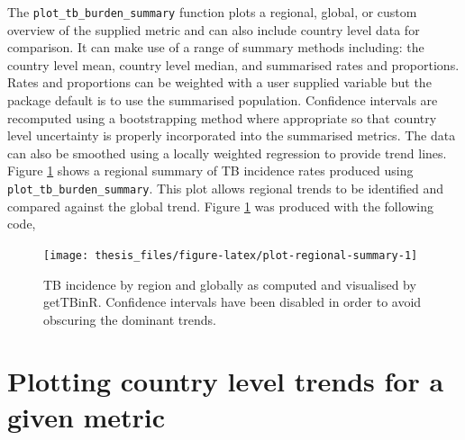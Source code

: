 \documentclass[11pt,twoside]{bristolthesis}
\begin{document}
  The \texttt{plot\_tb\_burden\_summary} function plots a regional, global, or custom overview of the supplied metric and can also include country level data for comparison. It can make use of a range of summary methods including: the country level mean, country level median, and summarised rates and proportions. Rates and proportions can be weighted with a user supplied variable but the package default is to use the summarised population. Confidence intervals are recomputed using a bootstrapping method where appropriate so that country level uncertainty is properly incorporated into the summarised metrics. The data can also be smoothed using a locally weighted regression to provide trend lines. Figure \ref{fig:plot-regional-summary} shows a regional summary of TB incidence rates produced using \texttt{plot\_tb\_burden\_summary}. This plot allows regional trends to be identified and compared against the global trend. Figure \ref{fig:plot-regional-summary} was produced with the following code,
  \begin{Shaded}
  \begin{Highlighting}[]
  \NormalTok{(} \NormalTok{, } \NormalTok{,}
                          \NormalTok{) }\OperatorTok{+}
  \StringTok{  }\NormalTok{(} \NormalTok{(} \NormalTok{))}
  \end{Highlighting}
  \end{Shaded}
  \begin{figure}
  
  {\centering \texttt{[image: thesis\_files/figure-latex/plot-regional-summary-1]} 
  
  }
  
  \caption[TB incidence by region and globally as computed and visualised by getTBinR.]{TB incidence by region and globally as computed and visualised by getTBinR. Confidence intervals have been disabled in order to avoid obscuring the dominant trends.}\label{fig:plot-regional-summary}
  \end{figure}
  \hypertarget{plotting-country-level-trends-for-a-given-metric}{%
  \section{Plotting country level trends for a given metric}\label{plotting-country-level-trends-for-a-given-metric}}
  
\end{document}
